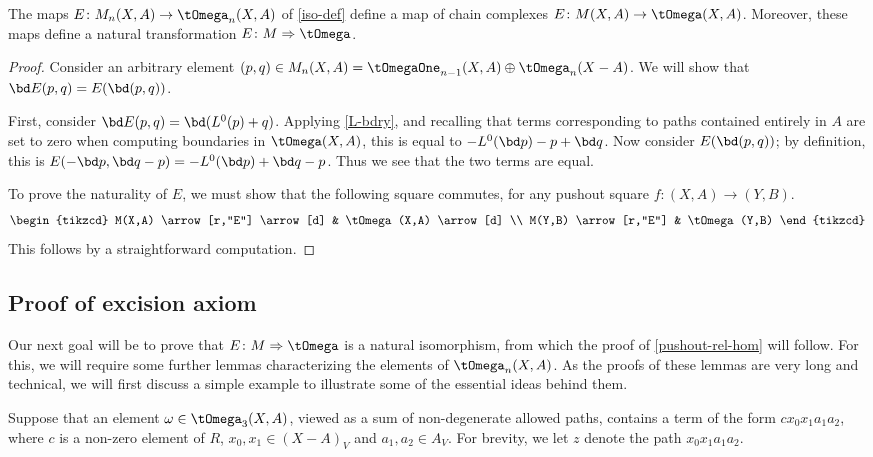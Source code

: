 \begin{proposition}\label{iso-pres-bdry}
The maps $E \colon M_n(X,A) \to \tOmega_n(X,A)$ of \cref{iso-def} define a map of chain complexes $E \colon M(X,A) \to \tOmega(X,A)$. Moreover, these maps define a natural transformation $E \colon M \Rightarrow \tOmega$.
\end{proposition}

\begin{proof}
Consider an arbitrary element $(p,q) \in M_n(X,A) = \tOmegaOne_{n-1}(X,A) \oplus \tOmega_{n}(X-A)$. We will show that $\bd E(p,q) = E(\bd(p,q))$.

First, consider $\bd E(p,q) = \bd(L^0(p) + q)$. Applying \cref{L-bdry}, and recalling that terms corresponding to paths contained entirely in $A$ are set to zero when computing boundaries in $\tOmega(X,A)$, this is equal to $-L^0(\bd p) - p + \bd q$. Now consider $E(\bd(p,q))$; by definition, this is $E(-\bd p, \bd q - p) = -L^0(\bd p) + \bd q - p$. Thus we see that the two terms are equal.

To prove the naturality of $E$, we must show that the following square commutes, for any pushout square $f \colon (X,A) \to (Y,B)$.
\[
\begin{tikzcd}
M(X,A) \arrow[r,"E"] \arrow[d] & \tOmega(X,A) \arrow[d] \\
M(Y,B) \arrow[r,"E"] & \tOmega(Y,B)
\end{tikzcd}
\]
This follows by a straightforward computation.
\end{proof}

\subsection*{Proof of excision axiom}

Our next goal will be to prove that $E \colon M \Rightarrow \tOmega$ is a natural isomorphism, from which the proof of \cref{pushout-rel-hom} will follow.
For this, we will require some further lemmas characterizing the elements of $\tOmega_n(X,A)$. As the proofs of these lemmas are very long and technical, we will first discuss a simple example to illustrate some of the essential ideas behind them. 

Suppose that an element $\omega \in \tOmega_3(X,A)$, viewed as a sum of non-degenerate allowed paths, contains a term of the form $c x_0 x_1 a_1 a_2$, where $c$ is a non-zero element of $R$, $x_0, x_1 \in (X-A)_V$ and $a_1, a_2 \in A_V$. For brevity, we let $z$ denote the path $x_0 x_1 a_1 a_2$. 

